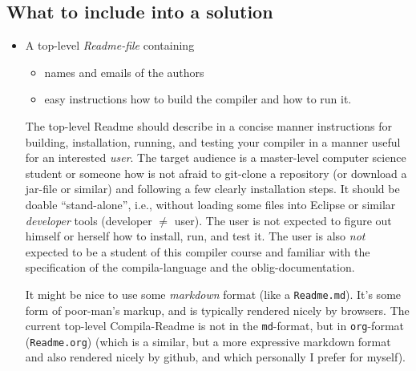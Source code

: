 \documentclass[10pt,freeform]{handout}[2014/08/13]
\begin{document}
\subsection{What to include into a solution}
\label{sec:what-include-into}


\begin{itemize}
\item A top-level \emph{Readme-file} containing
  \begin{itemize}
  \item names and emails of the authors
  \item easy instructions how to build the compiler and how to run it.
  \end{itemize}
  The top-level Readme should describe in a concise manner instructions for
  building, installation, running, and testing your compiler in a manner
  useful for an interested \emph{user}. The target audience is a
  master-level computer science student or someone how is not afraid to
  git-clone a repository (or download a jar-file or similar) and following
  a few clearly installation steps. It should be doable ``stand-alone'',
  i.e., without loading some files into Eclipse or similar \emph{developer}
  tools (developer $\not=$ user). The user is not expected to figure out
  himself or herself how to install, run, and test it. The user is also
  \emph{not} expected to be a student of this compiler course and familiar
  with the specification of the compila-language and the
  oblig-documentation.

  It might be nice to use some \emph{markdown} format (like a
  \texttt{Readme.md}). It's some form of poor-man's markup, and is
  typically rendered nicely by browsers. The current top-level
  Compila-Readme is not in the \texttt{md}-format, but in
  \texttt{org}-format (\texttt{Readme.org}) (which is a similar, but a more
  expressive markdown format and also rendered nicely by github, and which
  personally I prefer for myself).
  

\end{itemize}
\end{document}
